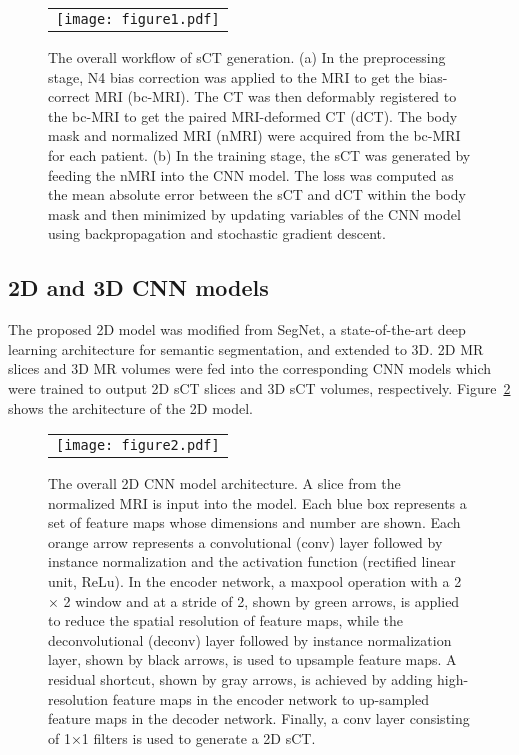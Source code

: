 \begin{figure}
\begin{center}
\begin{tabular}{c}
\texttt{[image: figure1.pdf]}
\end{tabular}
\end{center}
\caption 
{\label{fig1}
The overall workflow of sCT generation. (a) In the preprocessing stage, N4 bias correction was applied to the MRI to get the bias-correct MRI (bc-MRI). The CT was then deformably registered to the bc-MRI to get the paired MRI-deformed CT (dCT). The body mask and normalized MRI (nMRI) were acquired from the bc-MRI for each patient. (b) In the training stage, the sCT was generated by feeding the nMRI into the CNN model. The loss was computed as the mean absolute error between the sCT and dCT within the body mask and then minimized by updating variables of the CNN model using backpropagation and stochastic gradient descent.} 
\end{figure} 

\subsection{2D and 3D CNN models} 
The proposed 2D model was modified from SegNet{\cite{RN27}}, a state-of-the-art deep learning architecture for semantic segmentation, and extended to 3D. 2D MR slices and 3D MR volumes were fed into the corresponding CNN models which were trained to output 2D sCT slices and 3D sCT volumes, respectively. Figure~\ref{fig2} shows the architecture of the 2D model.  

\begin{figure}
\begin{center}
\begin{tabular}{c}
\texttt{[image: figure2.pdf]}
\end{tabular}
\end{center}
\caption 
{\label{fig2}
The overall 2D CNN model architecture. A slice from the normalized MRI is input into the model. Each blue box represents a set of feature maps whose dimensions and number are shown. Each orange arrow represents a convolutional (conv) layer followed by instance normalization and the activation function (rectified linear unit, ReLu). In the encoder network, a maxpool operation with a 2 $\times$ 2 window and at a stride of 2, shown by green arrows, is applied to reduce the spatial resolution of feature maps, while the deconvolutional (deconv) layer followed by instance normalization layer, shown by black arrows, is used to upsample feature maps. A residual shortcut, shown by gray arrows, is achieved by adding high-resolution feature maps in the encoder network to up-sampled feature maps in the decoder network. Finally, a conv layer consisting of 1×1 filters is used to generate a 2D sCT.} 
\end{figure} 


